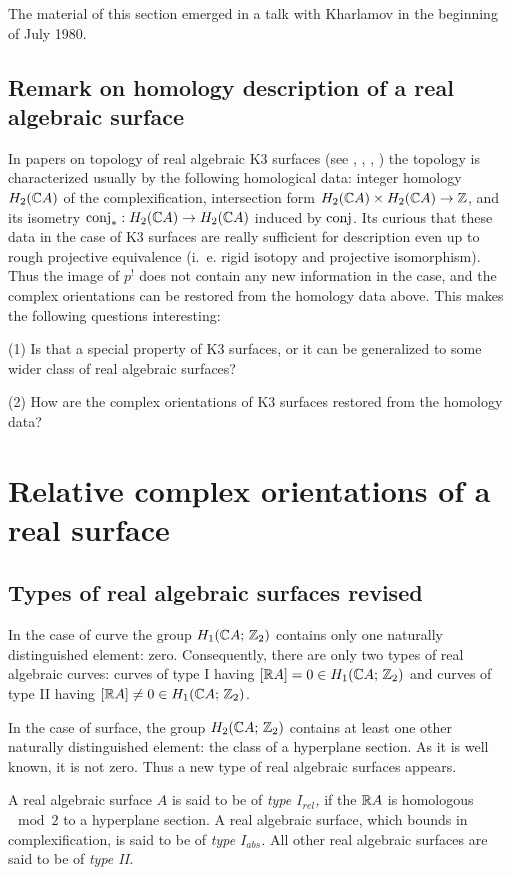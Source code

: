 \documentclass{article}
\numberwithin{equation}{section}
\begin{document}
The material of this section emerged in a talk with Kharlamov in
the beginning of July 1980.


\subsection{Remark on homology description of a real algebraic
surface}\label{s2.5}
In papers on topology of real algebraic K3 surfaces (see
\cite{Kh2}, \cite{Kh3}, \cite{N}, \cite{Kh4}) the topology is
characterized usually by the following homological data: integer
homology $H_2(\mathbb C A)$ of the complexification, intersection form
$H_2(\mathbb C A)\times H_2(\mathbb C A)\to \mathbb Z$, and its isometry
$\operatorname{conj}_*:H_2(\mathbb C A)\to H_2(\mathbb C A)$ induced by $\operatorname{conj}$. Its curious that
these data in the case of K3 surfaces are really sufficient for
description even up to rough projective equivalence (i.~e.
rigid isotopy and projective isomorphism). Thus the image
of $p^!$ does not contain any new information in the case,
and the complex orientations can be restored from the
homology data above. This makes the following questions interesting:

(1) Is that a special property of K3 surfaces, or it can be
generalized to some wider class of real algebraic surfaces?

(2) How are the complex orientations of K3 surfaces restored from
the homology data?


\section{Relative complex orientations of a real surface}\label{s3} 

\subsection{Types of real algebraic surfaces revised}\label{s3.1}
In the
case of curve the group $H_1(\mathbb C A;\,\mathbb Z_2)$ contains only one
naturally distinguished element: zero. Consequently, there are only two
types of real algebraic curves: curves of type I having $[\mathbb R A]=0\in
H_1(\mathbb C A;\,\mathbb Z_2)$ and curves of type II having $[\mathbb R A]\ne0\in
H_1(\mathbb C A;\,\mathbb Z_2)$.

In the case of surface, the group $H_2(\mathbb C A;\,\mathbb Z_2)$ contains at
least one other naturally distinguished element: the class of
a hyperplane section. As it is well known, it is not zero. Thus
a new type of real algebraic surfaces appears.

A real algebraic surface $A$ is said to be of {\it type $I_{rel}$,\/}
if the $\mathbb R A$ is homologous $\mod 2$ to a hyperplane section. A real
algebraic surface, which bounds in complexification, is said to be
of {\it type $I_{abs}$.\/} All other real algebraic surfaces are said
to be of {\it type II.\/}
\end{document}
